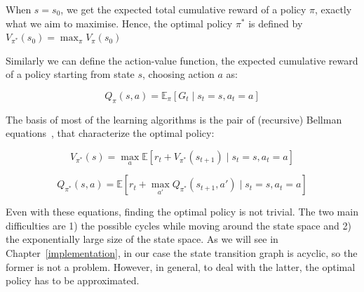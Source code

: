 When $s=s_0$, we get the expected total cumulative reward of a policy $\pi$, exactly what we aim to maximise. Hence, the optimal policy $\pi^*$ is defined by $V_{\pi^*}(s_0)=\max_\pi V_{\pi}(s_0)$

Similarly we can define the action-value function, the expected cumulative reward of a policy starting from state $s$, choosing action $a$ as:

\begin{equation}\label{eq:actionvalueFunction}
Q_{\pi}(s, a)=\mathbb{E}_\pi[G_t \mid s_t = s, a_t = a]
\end{equation}


The basis of most of the learning algorithms is the pair of (recursive) Bellman equations~\cite{bellman1957bellmanequation}, that characterize the optimal policy:


\begin{equation}\label{eq:bellmanState}
V_{\pi^*}(s) = \max_a \mathbb{E} [r_t + V_{\pi^*}(s_{t+1}) \mid s_t=s, a_t=a]
\end{equation}


\begin{equation} \label{eq:bellmanAction}
Q_{\pi^*}(s,a) = \mathbb{E} [r_t + \max_{a'} Q_{\pi^*}(s_{t+1},a') \mid s_t=s, a_t=a ] 
\end{equation}

Even with these equations, finding the optimal policy is not trivial. The two main difficulties are 1) the possible cycles while moving around the state space and 2) the exponentially large size of the state space. As we will see in Chapter~\ref{implementation}, in our case the state transition graph is acyclic, so the former is not a problem. However, in general, to deal with the latter, the optimal policy has to be approximated.



